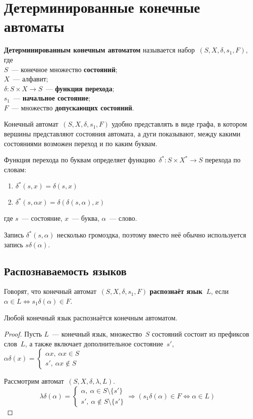 \section{Детерминированные конечные автоматы}
 \textbf{Детерминированным конечным автоматом} называется набор~$(S, X, \delta, s_1, F)$, где\\
$S$~--- конечное множество \textbf{состояний};\\
$X$~--- алфавит;\\
$\delta \colon S \times X \to S$~--- \textbf{функция перехода};\\
$s_1$~--- \textbf{начальное состояние};\\
$F$~--- множество \textbf{допускающих состояний}.

Конечный автомат~$(S, X, \delta, s_1, F)$ удобно представлять в виде графа, в котором вершины представляют состояния автомата, а дуги показывают, между какими состояниями возможен переход и по каким буквам.

Функция перехода по буквам определяет функцию~$\delta^* \colon S \times X^* \to S$ перехода по словам:
\begin{enumerate}
	\item $\delta^*(s, x) = \delta(s, x)$
	\item $\delta^*(s, \alpha x) = \delta(\delta(s, \alpha), x)$
\end{enumerate}
где $s$~--- состояние, $x$~--- буква, $\alpha$~--- слово.

Запись $\delta^*(s, \alpha)$ несколько громоздка, поэтому вместо неё обычно используется запись $s \delta(\alpha)$.

\subsection{Распознаваемость языков}
Говорят, что конечный автомат~$(S, X, \delta, s_1, F)$ \textbf{распознаёт язык~$L$}, если $\alpha \in L \Leftrightarrow s_1 \delta(\alpha) \in F$.

\begin{statement}
Любой конечный язык распознаётся конечным автоматом.
\end{statement}
\begin{proof}
Пусть $L$~--- конечный язык, множество~$S$ состояний состоит из префиксов слов~$L$, а также включает дополнительное состояние~$s'$, $\alpha \delta(x) =
\begin{cases}
\alpha x, \ \alpha x \in S \\
s', \ \alpha x \notin S
\end{cases}$

Рассмотрим автомат~$(S, X, \delta, \lambda, L)$.
\begin{equation*}
\lambda \delta(\alpha) =
\begin{cases}
\alpha, \ \alpha \in S \setminus \{ s' \} \\
s', \ \alpha \notin S \setminus \{ s' \}
\end{cases} \Rightarrow
(s_1 \delta(\alpha) \in F \Leftrightarrow \alpha \in L)
\end{equation*}
\end{proof}


